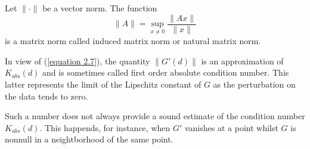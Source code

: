 \begin{theorem}
    Let $\| \cdot \|$ be a vector norm. The function
    \begin{equation}
        \| A \| = \sup_{x \neq 0} \frac{\| A x \|}{\|x \|}
        \label{equation 1.19}
    \end{equation}
    is a matrix norm called induced matrix norm or natural matrix norm.
\end{theorem}

In view of (\ref{equation 2.7}), the quantity $\| G'(d) \|$ is an approximation of $K_{abs}(d)$ and is sometimes called first order absolute condition number. This latter represents the limit of the Lipschitz constant of $G$ as the perturbation on the data tends to zero.

Such a number does not always provide a sound estimate of the condition number $K_{abs}(d)$. This happends, for instance, when $G'$ vanishes at a point whilst $G$ is nonnull in a neightborhood of the same point.